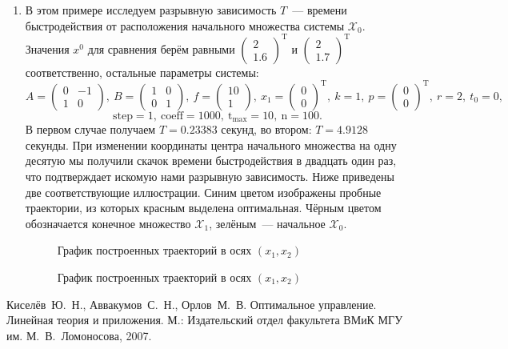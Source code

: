 \documentclass[a4paper,11pt]{article}
\begin{document}
\begin{enumerate}
\item В этом примере исследуем разрывную зависимость $T$~--- времени быстродействия от расположения начального множества системы $\mathcal{X}_0$. Значения $x^0$ для сравнения берём равными 
$\begin{pmatrix}
  2\\
  1.6
\end{pmatrix}^\mathrm{T}$ и 
$\begin{pmatrix}
  2\\
  1.7
\end{pmatrix}^\mathrm{T}$ соответственно, остальные параметры системы: 
\[A = \begin{pmatrix}
  0 & -1 \\
  1 & 0
\end{pmatrix}, \ 
B = \begin{pmatrix}
  1 & 0 \\
  0 & 1
\end{pmatrix}, \ 
f = \begin{pmatrix}
  10\\
  1
\end{pmatrix}, \ 
x_1 = \begin{pmatrix}
  0\\
  0
\end{pmatrix}^\mathrm{T}, \ 
k = 1, \  
p = \begin{pmatrix}
  0\\
  0
\end{pmatrix}^\mathrm{T}, \ 
r = 2, \ 
t_0 = 0, \] 
\[ \mathrm{step} = 1, \ \mathrm{coeff} = 1000, \ \mathrm{t_{max}} = 10, \ \mathrm{n} = 100. \] 
В первом случае получаем $T = 0.23383$ секунд, во втором: $T = 4.9128$ секунды. При изменении координаты центра начального множества на одну десятую мы получили скачок времени быстродействия в двадцать один раз, что подтверждает искомую нами разрывную зависимость. Ниже приведены две соответствующие иллюстрации. Синим цветом изображены пробные траектории, из которых красным выделена оптимальная. Чёрным цветом обозначается конечное множество $\mathcal{X}_1$, зелёным~--- начальное $\mathcal{X}_0$.
\begin{figure}[H]
\caption{График построенных траекторий в осях $(x_1, x_2)$}
\end{figure}
\begin{figure}[H]
\centering{\texttt{[image: Разрывная1.eps]}}
\caption{График построенных траекторий в осях $(x_1, x_2)$}
\end{figure}
\end{enumerate}

\newpage
\begin{thebibliography}{99}
\item Киселёв~Ю.~Н., Аввакумов~С.~Н., Орлов~М.~В. Оптимальное управление. Линейная теория и приложения. М.: Издательский отдел факультета ВМиК МГУ им. М.~В.~Ломоносова, 2007.  


\end{thebibliography}
\end{document}

